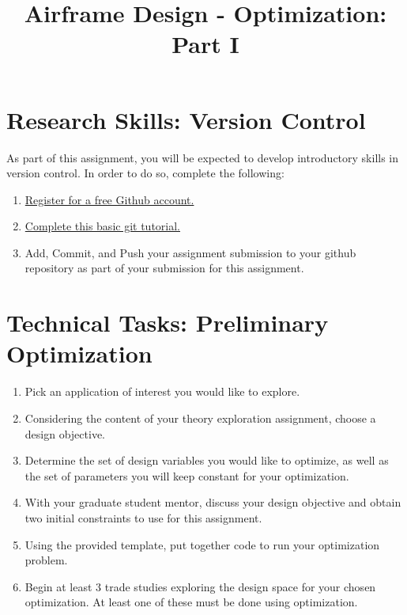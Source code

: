 \documentclass[11pt]{article}
\title{Airframe Design - Optimization: Part I}
\date{}
\begin{document}
	
\maketitle
\vspace{-2cm}

\section{Research Skills: Version Control}

As part of this assignment, you will be expected to develop introductory skills in version control.
In order to do so, complete the following:
\begin{enumerate}[label=\alph*.]
	\item \href{https://github.com/}{Register for a free Github account.}
	\item  \href{https://docs.github.com/en/get-started/quickstart/hello-world}{Complete this basic git tutorial.}
	\item Add, Commit, and Push your assignment submission to your github repository as part of your submission for this assignment.
\end{enumerate}
	
	
	
	

\section{Technical Tasks: Preliminary Optimization}

\begin{enumerate}[label=\alph*.]
    \item Pick an application of interest you would like to explore.
    \item Considering the content of your theory exploration assignment, choose a design objective.
    \item Determine the set of design variables you would like to optimize, as well as the set of parameters you will keep constant for your optimization.
    \item With your graduate student mentor, discuss your design objective and obtain two initial constraints to use for this assignment.
    \item Using the provided template, put together code to run your optimization problem. 
   	\item Begin at least 3 trade studies exploring the design space for your chosen optimization.  At least one of these must be done using optimization.
\end{enumerate}
	
\end{document}
